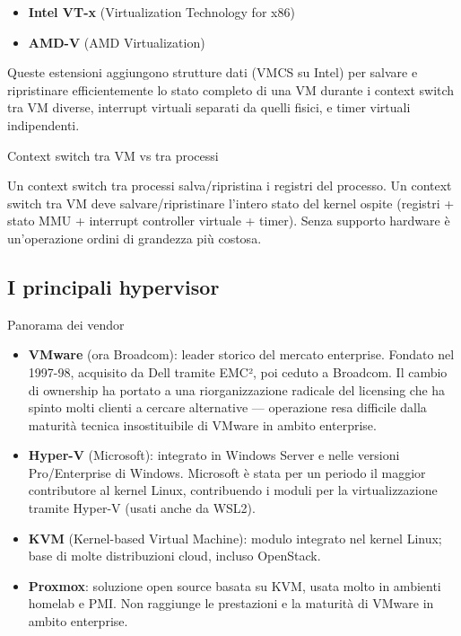 \documentclass[
  italian,
  openany]{book}
\providecommand{\tightlist}{%
  \setlength{\itemsep}{0pt}\setlength{\parskip}{0pt}}
\begin{document}
\begin{itemize}
\tightlist
\item
  \textbf{Intel VT-x} (Virtualization Technology for x86)
\item
  \textbf{AMD-V} (AMD Virtualization)
\end{itemize}

Queste estensioni aggiungono strutture dati (VMCS su Intel) per salvare
e ripristinare efficientemente lo stato completo di una VM durante i
context switch tra VM diverse, interrupt virtuali separati da quelli
fisici, e timer virtuali indipendenti.

\begin{calloutwarning}{Context switch tra VM vs tra processi}

Un context switch tra processi salva/ripristina i registri del processo.
Un context switch tra VM deve salvare/ripristinare l'intero stato del
kernel ospite (registri + stato MMU + interrupt controller virtuale +
timer). Senza supporto hardware è un'operazione ordini di grandezza più
costosa.

\end{calloutwarning}

\subsection{I principali hypervisor}\label{i-principali-hypervisor}

\begin{calloutnote}{Panorama dei vendor}

\begin{itemize}
\tightlist
\item
  \textbf{VMware} (ora Broadcom): leader storico del mercato enterprise.
  Fondato nel 1997-98, acquisito da Dell tramite EMC², poi ceduto a
  Broadcom. Il cambio di ownership ha portato a una riorganizzazione
  radicale del licensing che ha spinto molti clienti a cercare
  alternative --- operazione resa difficile dalla maturità tecnica
  insostituibile di VMware in ambito enterprise.
\item
  \textbf{Hyper-V} (Microsoft): integrato in Windows Server e nelle
  versioni Pro/Enterprise di Windows. Microsoft è stata per un periodo
  il maggior contributore al kernel Linux, contribuendo i moduli per la
  virtualizzazione tramite Hyper-V (usati anche da WSL2).
\item
  \textbf{KVM} (Kernel-based Virtual Machine): modulo integrato nel
  kernel Linux; base di molte distribuzioni cloud, incluso OpenStack.
\item
  \textbf{Proxmox}: soluzione open source basata su KVM, usata molto in
  ambienti homelab e PMI. Non raggiunge le prestazioni e la maturità di
  VMware in ambito enterprise.
\end{itemize}

\end{calloutnote}
\end{document}
